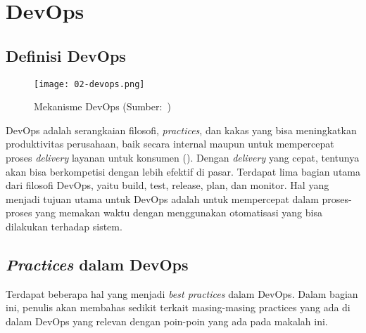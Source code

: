 \section{DevOps}

\subsection{Definisi DevOps}
\begin{figure}[h]
  \centering
  \texttt{[image: 02-devops.png]}
  \caption{Mekanisme DevOps (Sumber:~\cite{devops})}
\end{figure}
DevOps adalah serangkaian filosofi, \textit{practices}, dan kakas yang bisa meningkatkan produktivitas perusahaan, baik secara internal maupun untuk mempercepat proses \textit{delivery} layanan untuk konsumen (\cite{devops}).
Dengan \textit{delivery} yang cepat, tentunya akan bisa berkompetisi dengan lebih efektif di pasar.
Terdapat lima bagian utama dari filosofi DevOps, yaitu build, test, release, plan, dan monitor.
Hal yang menjadi tujuan utama untuk DevOps adalah untuk mempercepat dalam proses-proses yang memakan waktu dengan menggunakan otomatisasi yang bisa dilakukan terhadap sistem.

\subsection{\textit{Practices} dalam DevOps}
Terdapat beberapa hal yang menjadi \textit{best practices} dalam DevOps. 
Dalam bagian ini, penulis akan membahas sedikit terkait masing-masing practices yang ada di dalam DevOps yang relevan dengan poin-poin yang ada pada makalah ini.

